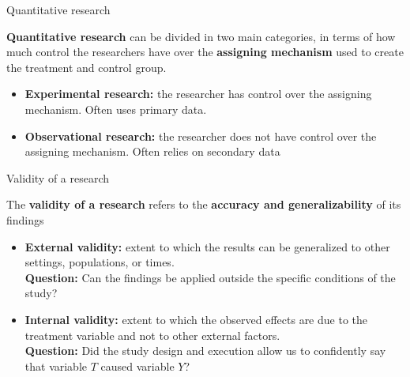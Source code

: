 \documentclass[aspectratio=169]{beamer}
\begin{document}
\begin{frame}{Quantitative research}

\textbf{Quantitative research} can be divided in two main categories, in terms of how much control the researchers have over the \textbf{assigning mechanism} used to create the treatment and control group. 
\vspace{0.2cm}

\begin{itemize}
    \item \textbf{Experimental research:} the researcher has control over the assigning mechanism. Often uses primary data.
    \item \textbf{Observational research:} the researcher does not have control over the assigning mechanism. Often relies on secondary data 
\end{itemize}

\end{frame}

\begin{frame}{Validity of a research}

The \textbf{validity of a research} refers to the \textbf{accuracy and generalizability} of its findings
\vspace{0.4cm}

    \begin{itemize}
        \item \textbf{External validity:} extent to which the results can be generalized to other settings, populations, or times. \\
        \textbf{Question:} Can the findings be applied outside the specific conditions of the study?
        
        \item \textbf{Internal validity:} extent to which the observed effects are due to the treatment variable and not to other external factors. \\
        \textbf{Question:} Did the study design and execution allow us to confidently say that variable $T$ caused variable $Y$?
    \end{itemize}
\end{frame}
\end{document}
